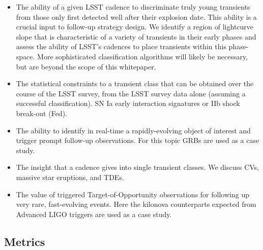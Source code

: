 \begin{itemize}
\item
  The ability of a given LSST cadence to discriminate truly young
  transients from those only first detected well after their explosion date.
  This ability is a crucial input to follow-up strategy design.
  We identify a region of lightcurve slope
  that is characteristic of a
  variety of transients in their early phases and assess the ability of LSST's
  cadences to place transients within this phase-space.
  More sophisticated classification algorithms will likely be necessary, but
  are beyond the scope of this whitepaper.
\item
  The statistical constraints to a transient class that can be obtained
  over the course of the LSST survey, from the LSST survey data alone
  (assuming a successful classification). SN Ia early interaction
  signatures or IIb shock break-out (Fed).
\item
  The ability to identify in real-time a rapidly-evolving
  object of interest and
  trigger prompt follow-up observations. For this topic GRBs are used as
  a case study.
\item
  The insight that a cadence gives into single transient classes. We
  discuss CVs, massive star eruptions, and TDEs.
  \item
	  The value of triggered Target-of-Opportunity observations for
	  following up very rare, fast-evolving events.   Here the kilonova
	  counterparts expected from Advanced LIGO triggers are used as a
	  case study.

\end{itemize}



\subsection{Metrics}
\label{sec:\chpname:metrics}

